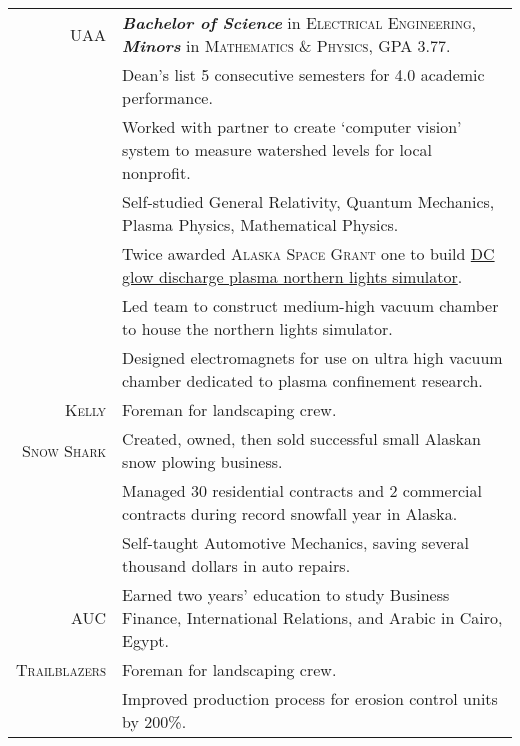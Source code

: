 \documentclass[letter,11pt]{article}
\begin{document}
\begin{center}
{\begin{tabular}{r|l}
\addlinespace[8pt]
		
		\textsc{UAA}
	&	\footnotesize{\textit{\textbf{Bachelor of Science}} in \textsc{Electrical Engineering}, \textit{\textbf{Minors}} in \textsc{Mathematics \& Physics}, GPA 3.77.}
	\\
		\rule{0pt}{8pt}
	&	\scriptsize{Dean's list 5 consecutive semesters for 4.0 academic performance.}
	\\
		\rule{0pt}{8pt}
	&	\scriptsize{Worked with partner to create `computer vision' system to measure watershed levels for local nonprofit.}
	\\
		\rule{0pt}{8pt}
	&	\scriptsize{Self-studied General Relativity, Quantum Mechanics, Plasma Physics, Mathematical Physics.}
	\\
		\rule{0pt}{8pt}
	&	\scriptsize{Twice awarded \textsc{Alaska Space Grant} one to build \href{https://github.com/blairmunroakusa/portfolio/tree/master/miscellaneous/planeterrella}{DC glow discharge plasma northern lights simulator}.}
	\\
		\rule{0pt}{8pt}
	&	\scriptsize{Led team to construct medium-high vacuum chamber to house the northern lights simulator.}
	\\
		\rule{0pt}{8pt}
	&	\scriptsize{Designed electromagnets for use on ultra high vacuum chamber dedicated to plasma confinement research.}
	\\

\addlinespace[8pt]

		\textsc{Kelly}
	&	\scriptsize{Foreman for landscaping crew.}
	\\

\addlinespace[8pt]

		\textsc{Snow Shark}
	&	\scriptsize{Created, owned, then sold successful small Alaskan snow plowing business.}
	\\
		\rule{0pt}{8pt}
	&	\scriptsize{Managed 30 residential contracts and 2 commercial contracts during record snowfall year in Alaska.}
	\\
		\rule{0pt}{8pt}
	&	\scriptsize{Self-taught Automotive Mechanics, saving several thousand dollars in auto repairs.}
	\\

\addlinespace[8pt]

		\textsc{AUC}
	&	\scriptsize{Earned two years' education to study Business Finance, International Relations, and Arabic in Cairo, Egypt.}
	\\

\addlinespace[8pt]

		\textsc{Trailblazers}
	&	\scriptsize{Foreman for landscaping crew.}
	\\
		\rule{0pt}{8pt}
	&	\scriptsize{Improved production process for erosion control units by 200\%.}
	\\


\end{tabular}}
\end{center}
\end{document}
